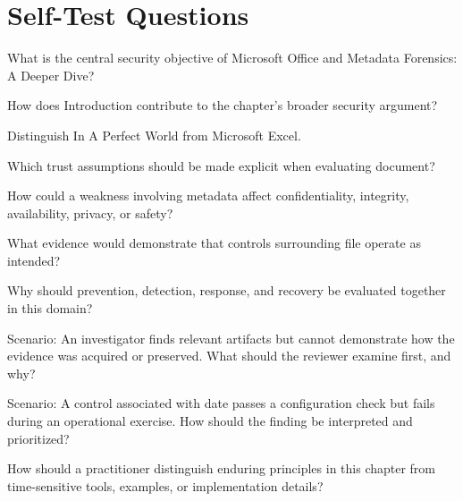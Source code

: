 \documentclass[11pt,letterpaper]{article}
\begin{document}
\section*{Self-Test Questions}
\begin{CornellRecallList}
\item What is the central security objective of Microsoft Office and Metadata Forensics: A Deeper Dive?
\item How does Introduction contribute to the chapter's broader security argument?
\item Distinguish In A Perfect World from Microsoft Excel.
\item Which trust assumptions should be made explicit when evaluating document?
\item How could a weakness involving metadata affect confidentiality, integrity, availability, privacy, or safety?
\item What evidence would demonstrate that controls surrounding file operate as intended?
\item Why should prevention, detection, response, and recovery be evaluated together in this domain?
\item Scenario: An investigator finds relevant artifacts but cannot demonstrate how the evidence was acquired or preserved. What should the reviewer examine first, and why?
\item Scenario: A control associated with date passes a configuration check but fails during an operational exercise. How should the finding be interpreted and prioritized?
\item How should a practitioner distinguish enduring principles in this chapter from time-sensitive tools, examples, or implementation details?
\end{CornellRecallList}
\end{document}
